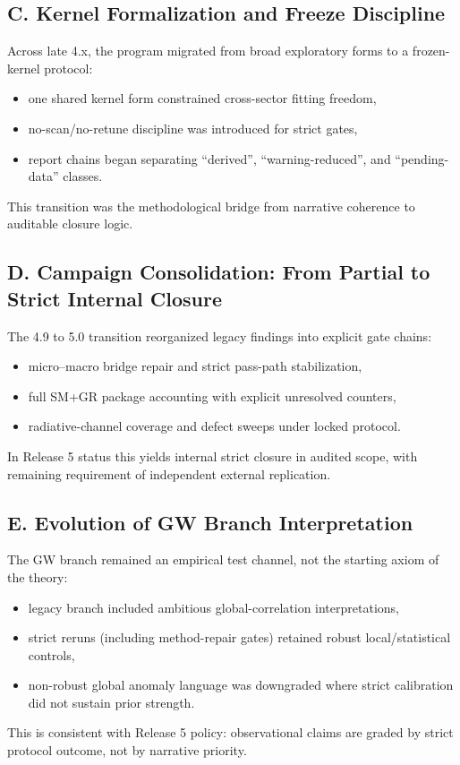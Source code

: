 \documentclass[11pt,a4paper]{article}
\begin{document}
\subsection{C. Kernel Formalization and Freeze Discipline}
Across late 4.x, the program migrated from broad exploratory forms to a frozen-kernel protocol:
\begin{itemize}[leftmargin=1.4em]
    \item one shared kernel form constrained cross-sector fitting freedom,
    \item no-scan/no-retune discipline was introduced for strict gates,
    \item report chains began separating ``derived'', ``warning-reduced'', and ``pending-data'' classes.
\end{itemize}
This transition was the methodological bridge from narrative coherence to auditable closure logic.

\subsection{D. Campaign Consolidation: From Partial to Strict Internal Closure}
The 4.9 to 5.0 transition reorganized legacy findings into explicit gate chains:
\begin{itemize}[leftmargin=1.4em]
    \item micro--macro bridge repair and strict pass-path stabilization,
    \item full SM+GR package accounting with explicit unresolved counters,
    \item radiative-channel coverage and defect sweeps under locked protocol.
\end{itemize}
In Release 5 status this yields internal strict closure in audited scope, with remaining requirement of independent external replication.

\subsection{E. Evolution of GW Branch Interpretation}
The GW branch remained an empirical test channel, not the starting axiom of the theory:
\begin{itemize}[leftmargin=1.4em]
    \item legacy branch included ambitious global-correlation interpretations,
    \item strict reruns (including method-repair gates) retained robust local/statistical controls,
    \item non-robust global anomaly language was downgraded where strict calibration did not sustain prior strength.
\end{itemize}
This is consistent with Release 5 policy: observational claims are graded by strict protocol outcome, not by narrative priority.
\end{document}

